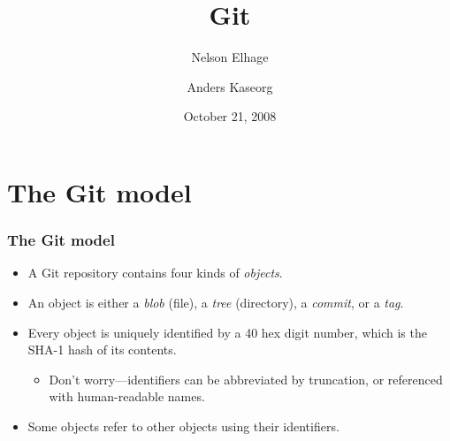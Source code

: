 \documentclass{beamer}
\title{Git}
\author{Nelson Elhage\and Anders Kaseorg}
\institute[SIPB]{Student Information Processing Board}
\date{October 21, 2008}
\begin{document}
\begin{frame}
    \titlepage
\end{frame}

\section{The Git model}

\begin{frame}
  \frametitle{The Git model}

  \begin{itemize}
  \item A Git repository contains four kinds of \emph{objects}.
  \item An object is either a \emph{blob} (file), a \emph{tree}
    (directory), a \emph{commit}, or a \emph{tag}.
  \item Every object is uniquely identified by a 40 hex digit number,
    which is the SHA-1 hash of its contents.
    \begin{itemize}
    \item Don't worry---identifiers can be abbreviated by truncation,
      or referenced with human-readable names.
    \end{itemize}
  \item Some objects refer to other objects using their identifiers.
  \end{itemize}
\end{frame}
\end{document}
